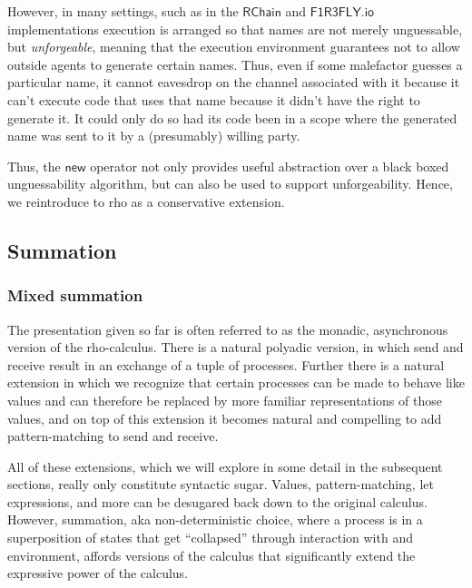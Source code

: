 However, in many settings, such as in the $\mathsf{RChain}$ and
$\mathsf{F1R3FLY.io}$ implementations execution is arranged so that
names are not merely unguessable, but \emph{unforgeable}, meaning that
the execution environment guarantees not to allow outside agents to
generate certain names. Thus, even if some malefactor guesses a
particular name, it cannot eavesdrop on the channel associated with it
because it can't execute code that uses that name because it didn't
have the right to generate it. It could only do so had its code been
in a scope where the generated name was sent to it by a (presumably)
willing party.

Thus, the $\mathsf{new}$ operator not only provides useful abstraction
over a black boxed unguessability algorithm, but can also be used to
support unforgeability. Hence, we reintroduce to rho as a conservative
extension.


\subsection{Summation}

\subsubsection{Mixed summation}
The presentation given so far is often referred to as the monadic,
asynchronous version of the rho-calculus. There is a natural polyadic
version, in which send and receive result in an exchange of a tuple of
processes. Further there is a natural extension in which we recognize
that certain processes can be made to behave like values and can
therefore be replaced by more familiar representations of those
values, and on top of this extension it becomes natural and compelling
to add pattern-matching to send and receive.

All of these extensions, which we will explore in some detail in the
subsequent sections, really only constitute syntactic sugar. Values,
pattern-matching, let expressions, and more can be desugared back down
to the original calculus. However, summation, aka non-deterministic
choice, where a process is in a superposition of states that get
``collapsed'' through interaction with and environment, affords
versions of the calculus that significantly extend the expressive
power of the calculus.

